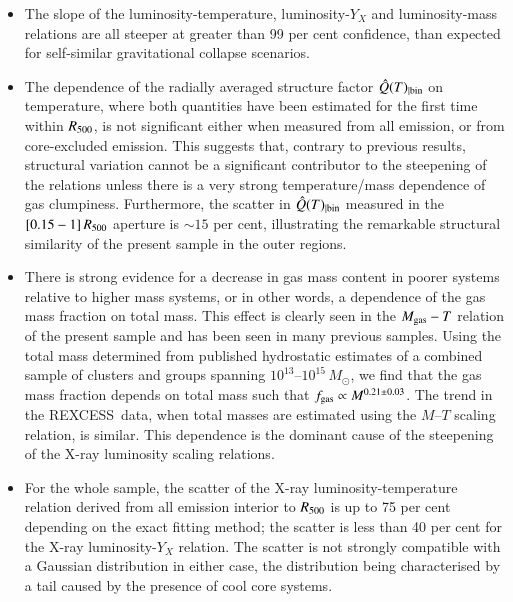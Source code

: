 \documentclass[oldversion]{aa}
\newcommand{\rexcess}{{\gwpfont REXCESS}}
\begin{document}
\begin{itemize}

\item The slope of the luminosity-temperature, luminosity-$Y_X$ and
  luminosity-mass relations are all steeper  at greater than 99 per cent confidence, than expected for
  self-similar gravitational collapse scenarios. 
  
\item  The dependence of the radially averaged structure
  factor $\hat{Q}(T)_{| \rm bin}$ on temperature, where both quantities have been
  estimated for the first time within $R_{500}$, is not significant either when measured from all emission, or from core-excluded emission. This suggests that, contrary to previous results, structural variation cannot be
  a significant contributor to the steepening of the relations unless there is a very strong temperature/mass dependence of gas clumpiness. Furthermore, the scatter in $\hat{Q}(T)_{| \rm bin}$ measured in the $[0.15-1]\,R_{500}$ aperture is $\sim 15$ per cent, illustrating the remarkable structural similarity of the present sample in the outer regions.

\item There is strong evidence for a decrease in gas mass content in poorer
  systems relative to higher mass systems, or in other words, a
  dependence of the gas mass fraction on total mass. This effect is clearly 
  seen in the $M_{\rm gas}-T$ relation of the
  present sample \citep{croston08} and has been seen in many previous samples. Using the
  total mass determined from published hydrostatic estimates of a combined sample of clusters and groups spanning $10^{13}$--$10^{15}\, M_\odot$, we find that the gas mass fraction depends on total mass such that $f_{\rm gas}
  \propto M^{0.21\pm 0.03}$. The trend in the \rexcess\ data, when total masses are estimated using the $M$--$T$ scaling relation, is similar.  This dependence is the dominant cause of the steepening of the X-ray luminosity scaling relations.

\item For the whole sample, the scatter of the X-ray luminosity-temperature relation derived from all emission interior to $R_{500}$ is up to 75 per cent depending on the exact fitting method; the
  scatter is less than 40 per cent for the X-ray luminosity-$Y_X$ relation. The scatter is not strongly compatible with a Gaussian distribution in either case, the distribution being characterised by a tail caused by the presence of cool core systems.
 

\end{itemize}
\end{document}
